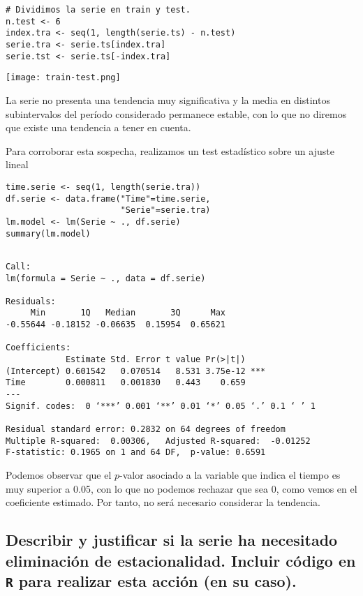 \documentclass[11pt]{article}
\begin{document}
\begin{verbatim}
# Dividimos la serie en train y test.
n.test <- 6
index.tra <- seq(1, length(serie.ts) - n.test)
serie.tra <- serie.ts[index.tra]
serie.tst <- serie.ts[-index.tra]
\end{verbatim}


\begin{center}
\texttt{[image: train-test.png]}
\end{center}


La serie no presenta una tendencia muy significativa y la media en
distintos subintervalos del período considerado permanece estable,
con lo que no diremos que existe una tendencia a tener en cuenta.

Para corroborar esta sospecha, realizamos un test estadístico sobre un
ajuste lineal 

\begin{verbatim}
time.serie <- seq(1, length(serie.tra))
df.serie <- data.frame("Time"=time.serie,
					   "Serie"=serie.tra)
lm.model <- lm(Serie ~ ., df.serie)
summary(lm.model)
\end{verbatim}

\begin{verbatim}

Call:
lm(formula = Serie ~ ., data = df.serie)

Residuals:
     Min       1Q   Median       3Q      Max 
-0.55644 -0.18152 -0.06635  0.15954  0.65621 

Coefficients:
            Estimate Std. Error t value Pr(>|t|)    
(Intercept) 0.601542   0.070514   8.531 3.75e-12 ***
Time        0.000811   0.001830   0.443    0.659    
---
Signif. codes:  0 ‘***’ 0.001 ‘**’ 0.01 ‘*’ 0.05 ‘.’ 0.1 ‘ ’ 1

Residual standard error: 0.2832 on 64 degrees of freedom
Multiple R-squared:  0.00306,	Adjusted R-squared:  -0.01252 
F-statistic: 0.1965 on 1 and 64 DF,  p-value: 0.6591
\end{verbatim}

Podemos observar que el \(p\)-valor asociado a la variable que indica el
tiempo es muy superior a 0.05, con lo que no podemos rechazar que sea
0, como vemos en el coeficiente estimado. Por tanto, no será necesario
considerar la tendencia. 

\subsection{Describir y justificar si la serie ha necesitado eliminación de estacionalidad. Incluir código en \texttt{R} para realizar esta acción (en su caso).}
\label{sec:orgf9e8349}
\end{document}
